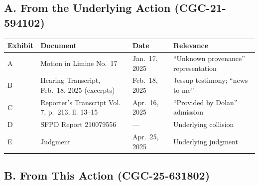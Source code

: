 \subsection{A. From the Underlying Action (CGC-21-594102)}\label{a.-from-the-underlying-action-cgc-21-594102}

{\def\LTcaptype{table} %
\begin{longtable}[]{@{}
  >{\raggedright\arraybackslash}p{}
  >{\raggedright\arraybackslash}p{}
  >{\raggedright\arraybackslash}p{}
  >{\raggedright\arraybackslash}p{}@{}}
\toprule\noalign{}
\begin{minipage}[b]{\linewidth}\raggedright
Exhibit
\end{minipage} & \begin{minipage}[b]{\linewidth}\raggedright
Document
\end{minipage} & \begin{minipage}[b]{\linewidth}\raggedright
Date
\end{minipage} & \begin{minipage}[b]{\linewidth}\raggedright
Relevance
\end{minipage} \\
\midrule\noalign{}
\endhead
\bottomrule\noalign{}
\endlastfoot
A & Motion in Limine No.~17 & Jan.~17, 2025 & ``Unknown provenance'' representation \\
B & Hearing Transcript, Feb.~18, 2025 (excerpts) & Feb.~18, 2025 & Jessup testimony; ``news to me'' \\
C & Reporter's Transcript Vol. 7, p.~213, ll. 13--15 & Apr.~16, 2025 & ``Provided by Dolan'' admission \\
D & SFPD Report 210079556 & --- & Underlying collision \\
E & Judgment & Apr.~25, 2025 & Underlying judgment \\
\end{longtable}
}

\subsection{B. From This Action (CGC-25-631802)}\label{b.-from-this-action-cgc-25-631802}

